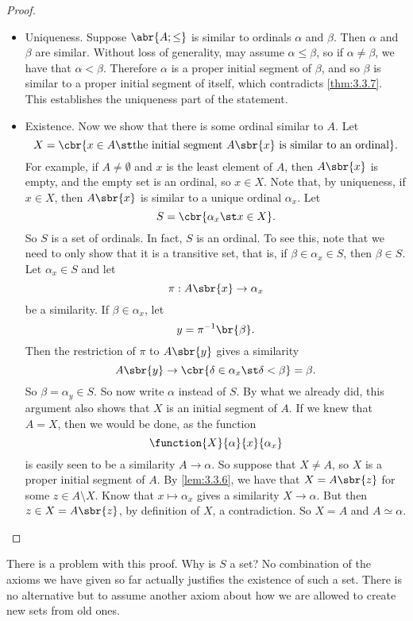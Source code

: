 \begin{proof}
\hfill
\begin{itemize}
\item Uniqueness. Suppose $ \abr{A; \le} $ is similar to ordinals $ \alpha $ and $ \beta $. Then $ \alpha $ and $ \beta $ are similar. Without loss of generality, may assume $ \alpha \le \beta $, so if $ \alpha \ne \beta $, we have that $ \alpha < \beta $. Therefore $ \alpha $ is a proper initial segment of $ \beta $, and so $ \beta $ is similar to a proper initial segment of itself, which contradicts \ref{thm:3.3.7}. This establishes the uniqueness part of the statement.
\item Existence. Now we show that there is some ordinal similar to $ A $. Let
$$ X = \cbr{x \in A \st \text{the initial segment} \ A\sbr{x} \ \text{is similar to an ordinal}}. $$
For example, if $ A \ne \emptyset $ and $ x $ is the least element of $ A $, then $ A\sbr{x} $ is empty, and the empty set is an ordinal, so $ x \in X $. Note that, by uniqueness, if $ x \in X $, then $ A\sbr{x} $ is similar to a unique ordinal $ \alpha_x $. Let
$$ S = \cbr{\alpha_x \st x \in X}. $$
So $ S $ is a set of ordinals. In fact, $ S $ is an ordinal. To see this, note that we need to only show that it is a transitive set, that is, if $ \beta \in \alpha_x \in S $, then $ \beta \in S $. Let $ \alpha_x \in S $ and let
$$ \pi : A\sbr{x} \to \alpha_x $$
be a similarity. If $ \beta \in \alpha_x $, let
$$ y = \pi^{-1}\br{\beta}. $$
Then the restriction of $ \pi $ to $ A\sbr{y} $ gives a similarity
$$ A\sbr{y} \to \cbr{\delta \in \alpha_x \st \delta < \beta} = \beta. $$
So $ \beta = \alpha_y \in S $. So now write $ \alpha $ instead of $ S $. By what we already did, this argument also shows that $ X $ is an initial segment of $ A $. If we knew that $ A = X $, then we would be done, as the function
$$ \function{X}{\alpha}{x}{\alpha_x} $$
is easily seen to be a similarity $ A \to \alpha $. So suppose that $ X \ne A $, so $ X $ is a proper initial segment of $ A $. By \ref{lem:3.3.6}, we have that $ X = A\sbr{z} $ for some $ z \in A \setminus X $. Know that $ x \mapsto \alpha_x $ gives a similarity $ X \to \alpha $. But then $ z \in X = A\sbr{z} $, by definition of $ X $, a contradiction. So $ X = A $ and $ A \simeq \alpha $.
\end{itemize}
\end{proof}


There is a problem with this proof. Why is $ S $ a set? No combination of the axioms we have given so far actually justifies the existence of such a set. There is no alternative but to assume another axiom about how we are allowed to create new sets from old ones.

